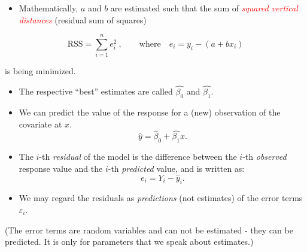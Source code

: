 \documentclass[10pt,ignorenonframetext,]{beamer}
\providecommand{\tightlist}{%
  \setlength{\itemsep}{0pt}\setlength{\parskip}{0pt}}
\begin{document}
\begin{frame}

\begin{itemize}
\tightlist
\item
  Mathematically, \(a\) and \(b\) are estimated such that the sum of
  \emph{\textcolor{red}{squared vertical distances}} (residual sum of
  squares)
\end{itemize}

\[\text{RSS} = \sum_{i=1}^n e_i^2 \ , \qquad \text{where} \quad e_i = y_i - (a + b x_i) \]

is being minimized.

\begin{itemize}
\item
  The respective ``best'' estimates are called \(\hat{\beta_0}\) and
  \(\hat{\beta_1}\).
\item
  We can predict the value of the response for a (new) observation of
  the covariate at \(x\). \[\hat{y} = \hat{\beta}_0 + \hat{\beta_1}x.\]
\item
  The \(i\)-th \emph{residual} of the model is the difference between
  the \(i\)-th \emph{observed} response value and the \(i\)-th
  \emph{predicted} value, and is written as: \[e_i = Y_i - \hat{y}_i.\]
\item
  We may regard the residuals as \emph{predictions} (not estimates) of
  the error terms \(\varepsilon_i\).
\end{itemize}

\tiny

(The error terms are random variables and can not be estimated - they
can be predicted. It is only for parameters that we speak about
estimates.)

\end{frame}
\end{document}
